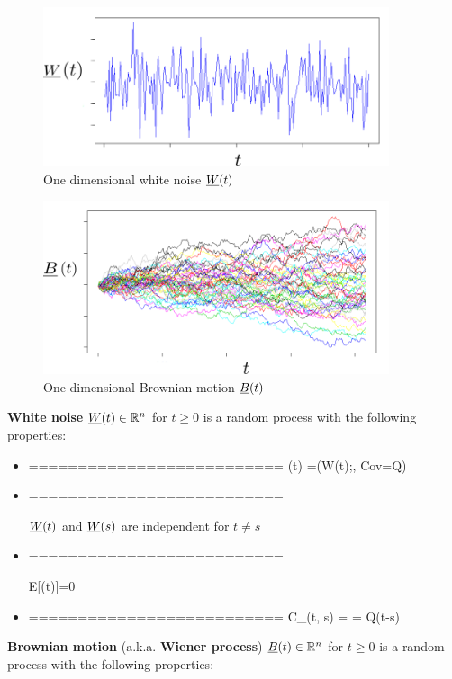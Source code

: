  \begin{figure}[h!]
 \centering
 \includegraphics[width=4in]
 {stochastic-diff-eqns/white-noise-labeled}
 \caption{One dimensional white noise $\rvW(t)$}
 \label{fig-white-noise-t}
 \end{figure}

 \begin{figure}[h!]
  \centering
  \includegraphics[width=4in]
  {stochastic-diff-eqns/brownian-motion-labeled}
  \caption{One dimensional Brownian motion $\rvB(t)$}
  \label{fig-brownian-motion-t}
  \end{figure}



{\bf White noise} $\rvW(t)
\in\RR^n$ for $t\geq 0$
is a random process with the
following properties:

\begin{itemize}
\item ==========================
\beq
\rvW(t) =\caln(W(t);, Cov=Q)
\eeq

\item ==========================

$\rvW(t)$ and $\rvW(s)$ are independent for
$t\neq s$

\item ==========================

\beq E[\rvW(t)]=0
\eeq

\item ==========================
\beq
C_\rvW(t, s) =  = Q\delta(t-s)
\eeq



\end{itemize}
{\bf Brownian motion} (a.k.a. {\bf Wiener process})
$\rvB(t)\in\RR^n$
for $t\geq 0$
is a random process with the
following properties:


